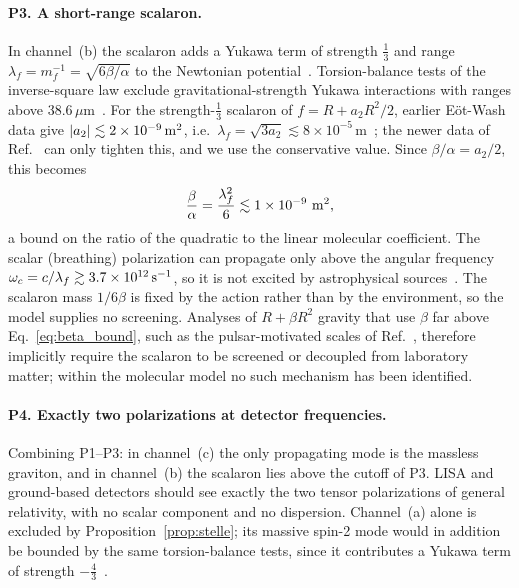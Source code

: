\documentclass[reprint,aps,prd,amsmath,amssymb,superscriptaddress,nofootinbib,floatfix]{revtex4-2}
\theoremstyle{plain}
\theoremstyle{definition}
\theoremstyle{remark}
\begin{document}
\paragraph*{P3. A short-range scalaron.} In channel~(b) the scalaron adds a Yukawa term of strength $\tfrac13$ and
range $\lambda_f=m_f^{-1}=\sqrt{6\beta/\alpha}$ to the Newtonian potential~\cite{Stelle1978,Berry2011}. Torsion-balance
tests of the inverse-square law exclude gravitational-strength Yukawa interactions with ranges above
$38.6\,\mu$m~\cite{Lee2020}. For the strength-$\tfrac13$ scalaron of $f=R+a_2R^2/2$, earlier E\"ot-Wash data give
$|a_2|\lesssim2\times10^{-9}\,{\rm m}^2$, i.e.\ $\lambda_f=\sqrt{3a_2}\lesssim8\times10^{-5}$\,m~\cite{Berry2011}; the newer data of
Ref.~\cite{Lee2020} can only tighten this, and we use the conservative value. Since $\beta/\alpha=a_2/2$, this becomes
\begin{equation}
\frac{\beta}{\alpha}=\frac{\lambda_f^2}{6}\lesssim1\times10^{-9}\ {\rm m}^2 ,
\label{eq:beta_bound}
\end{equation}
a bound on the ratio of the quadratic to the linear molecular coefficient. The scalar (breathing)
polarization can propagate only above the angular frequency $\omega_c=c/\lambda_f\gtrsim3.7\times10^{12}\,{\rm s}^{-1}$, so it is
not excited by astrophysical sources~\cite{Berry2011}. The scalaron mass $1/6\beta$ is fixed by the action rather
than by the environment, so the model supplies no screening. Analyses of $R+\beta R^2$ gravity that use $\beta$ far
above Eq.~\eqref{eq:beta_bound}, such as the pulsar-motivated scales of Ref.~\cite{FarmerLarson2026}, therefore
implicitly require the scalaron to be screened or decoupled from laboratory matter; within the molecular
model no such mechanism has been identified.

\paragraph*{P4. Exactly two polarizations at detector frequencies.} Combining P1--P3: in channel~(c) the only
propagating mode is the massless graviton, and in channel~(b) the scalaron lies above the cutoff of P3.
LISA and ground-based detectors should see exactly the two tensor polarizations of general relativity, with
no scalar component and no dispersion. Channel~(a) alone is excluded by Proposition~\ref{prop:stelle}; its massive
spin-2 mode would in addition be bounded by the same torsion-balance tests, since it contributes a Yukawa
term of strength $-\tfrac43$~\cite{Stelle1978}.
\end{document}
